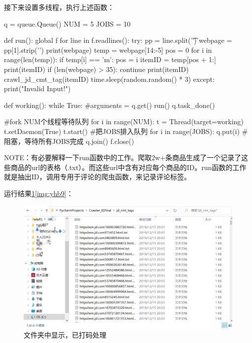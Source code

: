 接下来设置多线程，执行上述函数：
\begin{python}
q = queue.Queue()
NUM = 5
JOBS = 10

def run():
    global f
    for line in f.readlines():
        try:
            pp = line.split('\t')
            webpage = pp[1].strip('\n')
            print(webpage)
            temp = webpage[14:-5]
            pos = 0
            for i in range(len(temp)):
                if temp[i] == 'm':
                    pos = i
            itemID = temp[pos + 1:]
            print(itemID)
            if (len(webpage) > 35):
                continue
            print(itemID)
            crawl_jd_cmt_tag(itemID)
            time.sleep(random.random() * 3)
        except:
            print("Invalid Input!")

def working():
    while True:
        #arguments = q.get()
        run()
        q.task_done()


#fork NUM个线程等待队列
for i in range(NUM):
    t = Thread(target=working)
    t.setDaemon(True)
    t.start()
#把JOBS排入队列
for i in range(JOBS):
    q.put(i)
#阻塞，等待所有JOBS完成
q.join()
f.close()
\end{python}

NOTE：有必要解释一下run函数中的工作。爬取2w+条商品生成了一个记录了这些商品的url的表格（.txt）。而这些url中含有对应每个商品的ID。run函数的工作就是抽出ID，调用专用于评论的爬虫函数，来记录评论标签。

运行结果\ref{img:yhb8}\ref{img:yhb9}：

\begin{figure}[htbp]
\centering
\includegraphics[width=13.5cm]{img/yhb/folder_view_jd.png}
\caption{文件夹中显示，已打码处理} %
\label{img:yhb8}   %
\end{figure}

